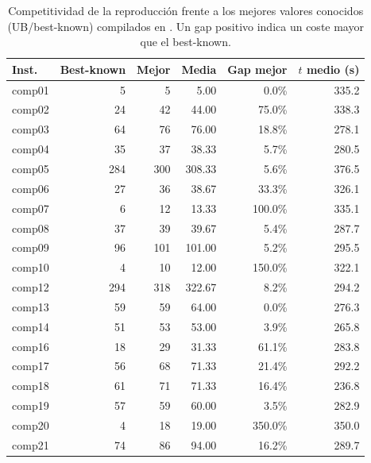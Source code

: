 \documentclass[journal]{IEEEtran}
\begin{document}
\begin{table}[!t]
\caption{Competitividad de la reproducción frente a los mejores valores conocidos (UB/best-known) compilados en \cite{ref2}. Un gap positivo indica un coste mayor que el best-known.}
\label{tab:results}
\centering
\footnotesize
\setlength{\tabcolsep}{5pt}
\begin{tabular}{lrrrrr}
\toprule
\textbf{Inst.} & \textbf{Best-known} & \textbf{Mejor} & \textbf{Media} & \textbf{Gap mejor} & \textbf{$t$ medio (s)}\\
\midrule

comp01 & 5 & 5 & 5.00 & 0.0\% & 335.2\\

comp02 & 24 & 42 & 44.00 & 75.0\% & 338.3\\

comp03 & 64 & 76 & 76.00 & 18.8\% & 278.1\\

comp04 & 35 & 37 & 38.33 & 5.7\% & 280.5\\

comp05 & 284 & 300 & 308.33 & 5.6\% & 376.5\\

comp06 & 27 & 36 & 38.67 & 33.3\% & 326.1\\

comp07 & 6 & 12 & 13.33 & 100.0\% & 335.1\\

comp08 & 37 & 39 & 39.67 & 5.4\% & 287.7\\

comp09 & 96 & 101 & 101.00 & 5.2\% & 295.5\\

comp10 & 4 & 10 & 12.00 & 150.0\% & 322.1\\

comp12 & 294 & 318 & 322.67 & 8.2\% & 294.2\\

comp13 & 59 & 59 & 64.00 & 0.0\% & 276.3\\

comp14 & 51 & 53 & 53.00 & 3.9\% & 265.8\\

comp16 & 18 & 29 & 31.33 & 61.1\% & 283.8\\

comp17 & 56 & 68 & 71.33 & 21.4\% & 292.2\\

comp18 & 61 & 71 & 71.33 & 16.4\% & 236.8\\

comp19 & 57 & 59 & 60.00 & 3.5\% & 282.9\\

comp20 & 4 & 18 & 19.00 & 350.0\% & 350.0\\

comp21 & 74 & 86 & 94.00 & 16.2\% & 289.7\\

\bottomrule
\end{tabular}
\end{table}
\end{document}
